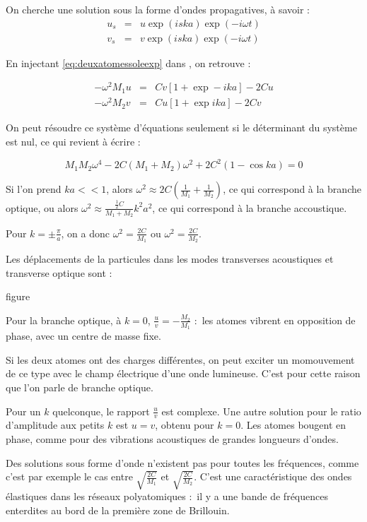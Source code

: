 On cherche une solution sous la forme d'ondes propagatives, à savoir :
\begin{eqnarray}
u_s & = &  u \exp (iska) \exp (-i\omega t) \\
v_s & = & v \exp (iska) \exp (-i\omega t)
\label{eq:deuxatomessolexp}
\end{eqnarray}

En injectant \ref{eq:deuxatomessoleexp} dans \label{eq:mvtdeuxatomes}, on
retrouve :

\begin{eqnarray}
-\omega^2 M_1 u & = & C v [ 1 + \exp -ika ] - 2Cu\\
-\omega^2 M_2 v & = & C u [ 1 + \exp ika ] - 2Cv
\end{eqnarray}

On peut résoudre ce système d'équations seulement si le déterminant du système
est nul, ce qui revient à écrire :

\begin{equation}
M_1M_2\omega^4 - 2C(M_1 + M_2) \omega^2 + 2C^2 (1-\cos ka) = 0
\end{equation}

Si l'on prend $ka << 1$, alors 
$\omega^2 \approx 2C \left(\frac{1}{M_1} + \frac{1}{M_2} \right)$, 
ce qui correspond à la branche optique, ou alors
$\omega^2 \approx \frac{\frac{1}{2}C}{M_1+M_2} k^2 a^2$,
ce qui correspond à la branche accoustique.

Pour $k=\pm \frac{\pi}{a}$, on a donc $\omega^2 = \frac{2C}{M_1}$ ou
$\omega^2 = \frac{2C}{M_2}$.

Les déplacements de la particules dans les modes transverses acoustiques et
transverse optique sont :

\TODO figure

Pour la branche optique, à $k=0$, $\frac{u}{v} = - \frac{M_2}{M_1}$ : les atomes
vibrent en opposition de phase, avec un centre de masse fixe.

Si les deux atomes ont des charges différentes, on peut exciter un momouvement
de ce type avec le champ électrique d'une onde lumineuse. C'est pour cette
raison que l'on parle de branche optique.

Pour un $k$ quelconque, le rapport $\frac{u}{v}$ est complexe. Une autre 
solution pour le ratio d'amplitude aux petits $k$ est $u=v$, obtenu pour
$k=0$. Les atomes bougent en phase, comme pour des vibrations acoustiques de
grandes longueurs d'ondes.

Des solutions sous forme d'onde n'existent pas pour toutes les fréquences,
comme c'est par exemple le cas entre $\sqrt{\frac{2C}{M_1}}$ et
$\sqrt{\frac{2C}{M_2}}$. C'est une caractéristique des ondes élastiques dans les
réseaux polyatomiques : il y a une bande de fréquences enterdites au bord de la
première zone de Brillouin.

